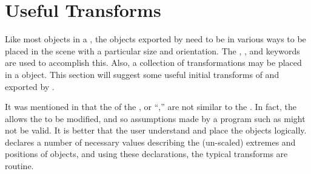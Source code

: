 	\section{Useful Transforms}%
	\label{sec:useful_transforms}
	Like most objects in a \IXpov{} ,
	the objects exported by \IXpkg{} need to be
	 in various ways to be
	placed in the scene with a particular size and
	orientation. The ,
	, and
	 keywords are used to
	accomplish this. Also, a collection of transformations
	may be placed in a  object.
	This section will suggest some useful initial transforms
	of  and  exported
	by \IXpkg{}.
	
	It was mentioned in 
	that the  of the \IXpkg{}
	, or ``,''
	are not similar to the \IXpov{}
	. In fact, the 
	allows the \IXpov{} 
	to be modified, and so assumptions made by a program
	such as \IXpkg{} might not be valid. It is better that
	the user understand \IXpov{}  and
	place the objects logically. \IXpkgu{} declares a number
	of necessary values describing the (un-scaled) extremes
	and positions of objects, and using these declarations,
	the typical transforms are routine.


